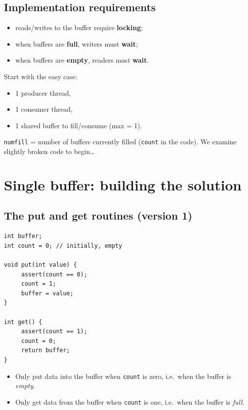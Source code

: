 \documentclass[11pt,a4paper]{article}
\begin{document}
\subsection{Implementation requirements}

\begin{itemize}
  \item reads/writes to the buffer require \textbf{locking};
  \item when buffers are \textbf{full}, writers must \textbf{wait};
  \item when buffers are \textbf{empty}, readers must \textbf{wait}.
\end{itemize}

Start with the easy case:
\begin{itemize}
  \item 1 producer thread,
  \item 1 consumer thread,
  \item 1 shared buffer to fill/consume (max = 1).
\end{itemize}
\texttt{numfill} = number of buffers currently filled (\texttt{count} in the
code). We examine slightly broken code to begin\ldots

\section{Single buffer: building the solution}

\subsection{The put and get routines (version 1)}

\begin{lstlisting}
int buffer;
int count = 0; // initially, empty

void put(int value) {
     assert(count == 0);
     count = 1;
     buffer = value;
}

int get() {
     assert(count == 1);
     count = 0;
     return buffer;
}
\end{lstlisting}

\begin{itemize}
  \item Only put data into the buffer when \texttt{count} is zero, i.e.\
        when the buffer is \emph{empty}.
  \item Only get data from the buffer when \texttt{count} is one, i.e.\
        when the buffer is \emph{full}.
\end{itemize}
\end{document}
